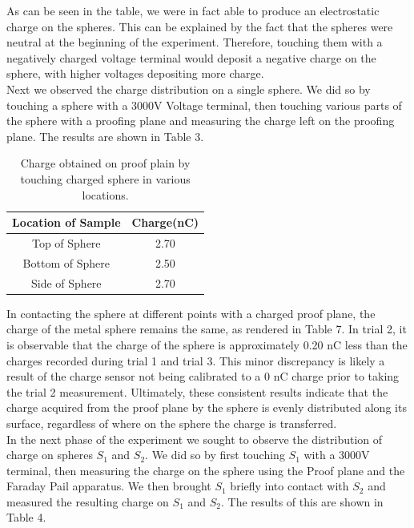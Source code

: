 \documentclass[12pt]{amsart}
\begin{document}
\indent As can be seen in the table, we were in fact able to produce an electrostatic charge on the spheres. This can be explained by the fact that the spheres were neutral at the beginning of the experiment. Therefore, touching them with a negatively charged voltage terminal would deposit a negative charge on the sphere, with higher voltages depositing more charge.\\

\indent Next we observed the charge distribution on a single sphere. We did so by touching a sphere with a 3000V Voltage terminal, then touching various parts of the sphere with a proofing plane and measuring the charge left on the proofing plane. The results are shown in Table 3.

\begin{table}[H]
	\begin{tabular}{ |c|c|}
		\hline
		Location of Sample & Charge(nC)\\
		\hline
		Top of Sphere&2.70\\
		Bottom of Sphere&2.50\\
		Side of Sphere&2.70\\
		\hline	
	\end{tabular}
	\caption{Charge obtained on proof plain by touching charged sphere in various locations.}
\end{table}

\indent In contacting the sphere at different points with a charged proof plane, the charge of the metal sphere remains the same, as rendered in Table 7. In trial 2, it is observable that the charge of the sphere is approximately 0.20 nC less than the charges recorded during trial 1 and trial 3. This minor discrepancy is likely a result of the charge sensor not being calibrated to a 0 nC charge prior to taking the trial 2 measurement. Ultimately, these consistent results indicate that the charge acquired from the proof plane by the sphere is evenly distributed along its surface, regardless of where on the sphere the charge is transferred. \\

\indent In  the next phase of the experiment we sought to observe the distribution of charge on spheres $S_1$ and $S_2$. We did so by first touching $S_1$ with a 3000V terminal, then measuring the charge on the sphere using the Proof plane and the Faraday Pail apparatus. We then brought $S_1$ briefly into contact with $S_2$ and measured the resulting charge on $S_1$ and $S_2$. The results of this are shown in Table 4.\\
\end{document}
